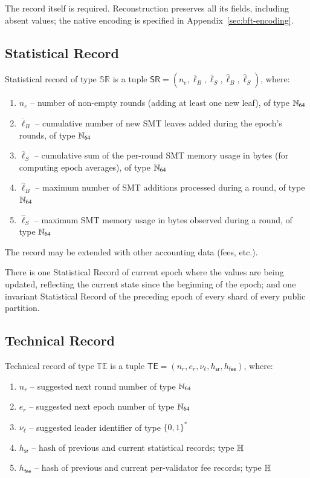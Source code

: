 The record itself is required. Reconstruction preserves all its fields, including absent values; the native encoding is specified in Appendix~\ref{sec:bft-encoding}.

\subsection{Statistical Record}\label{statistical-record}

Statistical record of type $\mathbb{SR}$ is a tuple $\mathsf{SR}=(n_e, \overline{\ell}_B, \overline{\ell}_S, \hat{\ell}_B, \hat{\ell}_S)$, where:
\begin{enumerate}
	\item $n_e$ -- number of non-empty rounds (adding at least one new leaf), of type $\mathbb{N}_{64}$
	\item $\overline{\ell}_B$ -- cumulative number of new SMT leaves added during the epoch's rounds, of type $\mathbb{N}_{64}$
	\item $\overline{\ell}_S$ -- cumulative sum of the per-round SMT memory usage in bytes (for computing epoch averages), of type $\mathbb{N}_{64}$
	\item $\hat{\ell}_B$ -- maximum number of SMT additions processed during a round, of type $\mathbb{N}_{64}$
	\item $\hat{\ell}_S$ -- maximum SMT memory usage in bytes observed during a round, of type $\mathbb{N}_{64}$
\end{enumerate}

The record may be extended with other accounting data (fees, etc.).

There is one Statistical Record of current epoch where the values are being updated, reflecting the current state since the beginning of the epoch; and one invariant Statistical Record of the preceding epoch of every shard of every public partition.

\subsection{Technical Record}\label{technical-record}

Technical record of type $\mathbb{TE}$ is a tuple $\mathsf{TE}=(n_r, e_r, \nu_\ell, h_\mathsf{sr}, h_\mathsf{fee})$, where:
\begin{enumerate}
	\item $n_r$ -- suggested next round number of type $\mathbb{N}_{64}$
	\item $e_r$ -- suggested next epoch number of type $\mathbb{N}_{64}$
	\item $\nu_\ell$ -- suggested leader identifier of type $\{0,1\}^\ast$
	\item $h_\mathsf{sr}$ -- hash of previous and current statistical records; type $\mathbb{H}$
	\item $h_\mathsf{fee}$ -- hash of previous and current per-validator fee records; type $\mathbb{H}$
\end{enumerate}

